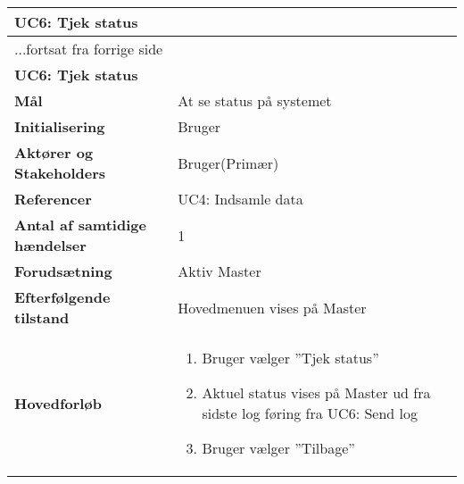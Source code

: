 \begin{center} \centering \label{UC6}
	\begin{longtable}{|p{5cm}|p{9cm}|}  %
	\hline
		\multicolumn{2}{|l|}{\textbf{UC6: Tjek status}} \\\hline %
		\endfirsthead
		
		\multicolumn{2}{l}{...fortsat fra forrige side} \\ \hline %
		\multicolumn{2}{|l|}{\textbf{UC6: Tjek status}} \\\hline %
		\endhead	
		
		\textbf{Mål}								&At se status på systemet			\\\hline
		\textbf{Initialisering}					&Bruger							\\\hline
		\textbf{Aktører og Stakeholders}			&Bruger(Primær)					\\\hline
		\textbf{Referencer}						&UC4: Indsamle data				\\\hline
		\textbf{Antal af samtidige hændelser}	&1								\\\hline
		\textbf{Forudsætning}					&Aktiv Master				\\\hline
		\textbf{Efterfølgende tilstand}			&Hovedmenuen vises på Master			\\\hline
		\textbf{Hovedforløb}					
			&\begin{enumerate}
	
				\item Bruger vælger ''Tjek status''
				
				\item Aktuel status vises på Master ud fra sidste log føring fra UC6: Send log
				
				\item Bruger vælger ''Tilbage''
	
			\end{enumerate}\\\hline
	\end{longtable} 
\end{center}

